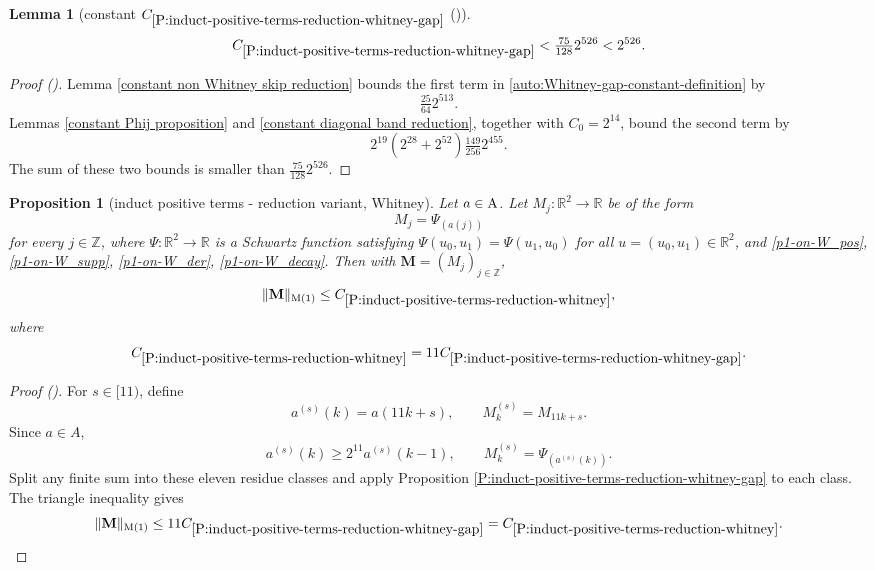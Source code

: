\documentclass[12pt,reqno]{amsart}
\newcommand{\auto}{{({\tiny\faCar})}}
\theoremstyle{plain}
\newtheorem{lemma}[theorem]{Lemma}
\newtheorem{proposition}[theorem]{Proposition}
\numberwithin{equation}{section}
\theoremstyle{remark}
\newcommand{\using}[1]{}
\newcommand{\Z}{{\mathbb Z}}
\newcommand{\M}{\mathbf{M}}
\begin{document}
\begin{lemma}[constant $C_{\ref{P:induct-positive-terms-reduction-whitney-gap}}$ \auto]\label{constant Whitney gap reduction}\using{constant non Whitney skip reduction}\using{P:induct-positive-terms-reduction-whitney-gap}\using{constant Phij proposition}\using{constant diagonal band reduction}
\begin{equation}\label{constant Whitney gap reduction bound}
C_{\ref{P:induct-positive-terms-reduction-whitney-gap}}
<\tfrac{75}{128}2^{526}<2^{526}.
\end{equation}
\end{lemma}
\begin{proof}[Proof \auto]
Lemma \ref{constant non Whitney skip reduction} bounds the first term in \eqref{auto:Whitney-gap-constant-definition} by
\[
\tfrac{25}{64}2^{513}.
\]
Lemmas \ref{constant Phij proposition} and \ref{constant diagonal band reduction}, together with $C_0=2^{14}$, bound the second term by
\[
2^{19}(2^{28}+2^{52})\tfrac{149}{256}2^{455}.
\]
The sum of these two bounds is smaller than $\frac{75}{128}2^{526}$.
\end{proof}

\begin{proposition}[induct positive terms - reduction variant, Whitney]
\label{P:induct-positive-terms-reduction-whitney}\using{P:induct-positive-terms-reduction-whitney-gap}
Let $a\in {\rm A}$. Let $M_j:\mathbb{R}^2\to \mathbb{R}$ be of the form
\begin{equation}\label{auto:Whitney-kernel}
M_j=\Psi_{(a(j))}
\end{equation}
for every $j\in\Z$, where $\Psi:\mathbb{R}^2\to \mathbb{R}$ is a Schwartz function satisfying $\Psi(u_0,u_1)=\Psi(u_1,u_0)$ for all $u=(u_0,u_1)\in\mathbb{R}^2$, and \eqref{p1-on-W_pos}, \eqref{p1-on-W_supp}, \eqref{p1-on-W_der}, \eqref{p1-on-W_decay}. Then with $\M=(M_j)_{j\in\Z}$,
\begin{equation}\label{auto:Whitney-reduction-bound}
\|\M\|_{\rm M(1)} \le C_{\ref{P:induct-positive-terms-reduction-whitney}},
\end{equation}
where
\begin{equation}\label{auto:Whitney-constant-definition}
C_{\ref{P:induct-positive-terms-reduction-whitney}}
=11C_{\ref{P:induct-positive-terms-reduction-whitney-gap}}.
\end{equation}
\end{proposition}

\begin{proof}[Proof \auto]
For $s\in[11)$, define
\[
a^{(s)}(k)=a(11k+s),
\qquad
M^{(s)}_k=M_{11k+s}.
\]
Since $a\in A$,
\[
a^{(s)}(k)\ge2^{11}a^{(s)}(k-1),
\qquad
M^{(s)}_k=\Psi_{(a^{(s)}(k))}.
\]
Split any finite sum into these eleven residue classes and apply Proposition \ref{P:induct-positive-terms-reduction-whitney-gap} to each class. The triangle inequality gives
\[
\|\M\|_{\rm M(1)}
\le11C_{\ref{P:induct-positive-terms-reduction-whitney-gap}}
= C_{\ref{P:induct-positive-terms-reduction-whitney}}.
\]
\end{proof}
\end{document}
